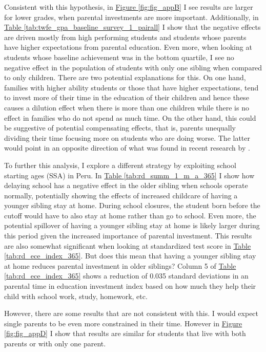 Consistent with this hypothesis, in \hyperref[fig:fig_appB]{Figure \ref{fig:fig_appB}} I see results are larger for lower grades, when parental investments are more important. Additionally, in \hyperref[tab:twfe_gpa_baseline_survey_1_pairall]{Table \ref{tab:twfe_gpa_baseline_survey_1_pairall}} I show that the negative effects are driven mostly from high performing students and students whose parents have higher expectations from parental education. Even more, when looking at students whose baseline achievement was in the bottom quartile, I see no negative effect in the population of students with only one sibling when compared to only children. There are two potential explanations for this. On one hand, families with higher ability students or those that have higher expectations, tend to invest more of their time in the education of their children and hence these causes a dilution effect when there is more than one children while there is no effect in families who do not spend as much time. On the other hand, this could be suggestive of potential compensating effects, that is, parents  unequally dividing their time focusing more on students who are doing worse. The latter would point in an opposite direction of what was found in recent research by \cite{giannola_parental_2024}.

To further this analysis, I explore a different strategy by exploiting school starting ages (SSA) in Peru. In \hyperref[tab:rd_summ_1_m_a_365]{Table \ref{tab:rd_summ_1_m_a_365}} I show how delaying school has a negative effect in the older sibling when schools operate normally, potentially showing the effects of increased childcare of having a younger sibling stay at home. During school closures, the student born before the cutoff would have to also stay at home rather than go to school. Even more, the potential spillover of having a younger sibling stay at home is likely larger during this period given the increased importance of parental investment. This results are also somewhat significant when looking at standardized test score in \hyperref[tab:rd_ece_index_365]{Table \ref{tab:rd_ece_index_365}}. But does this mean that having a younger sibling stay at home reduces parental investment in older siblings? Column 5 of \hyperref[tab:rd_ece_index_365]{Table \ref{tab:rd_ece_index_365}} shows a reduction of 0.035 standard deviations in an parental time in education investment index based on how much they help their child with school work, study, homework, etc.

However, there are some results that are not consistent with this. I would expect single parents to be even more constrained in their time. However in \hyperref[fig:fig_appD]{Figure \ref{fig:fig_appD}} I show that results are similar for students that live with both parents or with only one parent.


